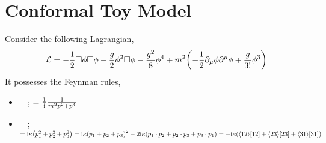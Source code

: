 \section{Conformal Toy Model}

Consider the following Lagrangian, 
\[\mathcal L=-\frac12\Box \phi\Box\phi-\frac{g}{2}\phi^2\Box\phi-\frac{g^2}{8}\phi^4+m^2\qty(-\frac12\partial_\mu\phi\partial^\mu\phi+\frac{g}{3!}\phi^3)\]
It possesses the Feynman rules,
\begin{itemize}
    \item \ \ ; $=\frac1{\textnormal{i}}\frac{1}{m^2p^2+p^4}$
	\item \ \ ; $=\textnormal{i}\kappa\qty(p_1^2+p_2^2+p_3^2)=\textnormal{i}\kappa\qty(p_1+p_2+p_3)^2-2\textnormal{i}\kappa\qty(p_1\cdot p_2+p_2\cdot p_3+p_3\cdot p_1)=-\textnormal{i}\kappa\qty(\langle12 \rangle[12]+\langle23 \rangle[23]+\langle31 \rangle[31])$
\end{itemize}